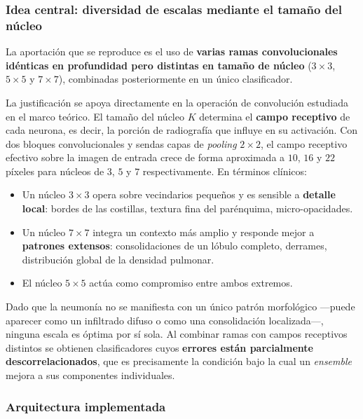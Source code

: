 \documentclass[11pt, a4paper]{article}
\numberwithin{equation}{section}
\begin{document}
\subsubsection{Idea central: diversidad de escalas mediante el tamaño del núcleo}

La aportación que se reproduce es el uso de \textbf{varias ramas convolucionales idénticas
en profundidad pero distintas en tamaño de núcleo} ($3\times3$, $5\times5$ y $7\times7$),
combinadas posteriormente en un único clasificador.

La justificación se apoya directamente en la operación de convolución estudiada en el
marco teórico. El tamaño del núcleo $K$ determina el \textbf{campo receptivo} de cada
neurona, es decir, la porción de radiografía que influye en su activación. Con dos bloques
convolucionales y sendas capas de \textit{pooling} $2\times2$, el campo receptivo efectivo
sobre la imagen de entrada crece de forma aproximada a $10$, $16$ y $22$ píxeles para
núcleos de $3$, $5$ y $7$ respectivamente. En términos clínicos:

\begin{itemize}
    \item Un núcleo $3\times3$ opera sobre vecindarios pequeños y es sensible a
    \textbf{detalle local}: bordes de las costillas, textura fina del parénquima,
    micro-opacidades.
    \item Un núcleo $7\times7$ integra un contexto más amplio y responde mejor a
    \textbf{patrones extensos}: consolidaciones de un lóbulo completo, derrames,
    distribución global de la densidad pulmonar.
    \item El núcleo $5\times5$ actúa como compromiso entre ambos extremos.
\end{itemize}

Dado que la neumonía no se manifiesta con un único patrón morfológico ---puede aparecer
como un infiltrado difuso o como una consolidación localizada---, ninguna escala es
óptima por sí sola. Al combinar ramas con campos receptivos distintos se obtienen
clasificadores cuyos \textbf{errores están parcialmente descorrelacionados}, que es
precisamente la condición bajo la cual un \textit{ensemble} mejora a sus componentes
individuales.

\subsubsection{Arquitectura implementada}

\end{document}
